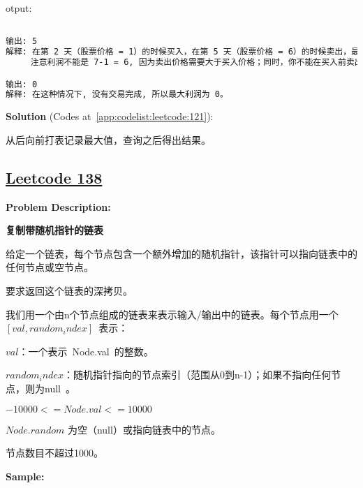 otput:\par

\begin{lstlisting}[language=bash]

输出: 5
解释: 在第 2 天（股票价格 = 1）的时候买入，在第 5 天（股票价格 = 6）的时候卖出，最大利润 = 6-1 = 5 。
     注意利润不能是 7-1 = 6, 因为卖出价格需要大于买入价格；同时，你不能在买入前卖出股票。

输出: 0
解释: 在这种情况下, 没有交易完成, 所以最大利润为 0。


\end{lstlisting}

\textbf{Solution }(Codes at~\ref{app:codelist:leetcode:121}):\par

从后向前打表记录最大值，查询之后得出结果。\par



\subsection{\href{https://leetcode-cn.com/}{Leetcode 138}}\label{app:problemlist:leetcode:138}

\textbf{Problem Description:}\par

\textbf{复制带随机指针的链表}\par

给定一个链表，每个节点包含一个额外增加的随机指针，该指针可以指向链表中的任何节点或空节点。\par

要求返回这个链表的深拷贝。 \par

我们用一个由n个节点组成的链表来表示输入/输出中的链表。每个节点用一个 $ [val, random_index] $ 表示：\par

$ val $：一个表示 Node.val 的整数。\par
$ random_index $：随机指针指向的节点索引（范围从0到n-1）；如果不指向任何节点，则为null 。\par

$ -10000 <= Node.val <= 10000 $\par

$ Node.random $ 为空（null）或指向链表中的节点。\par

节点数目不超过1000。\par


\textbf{Sample:}\par

